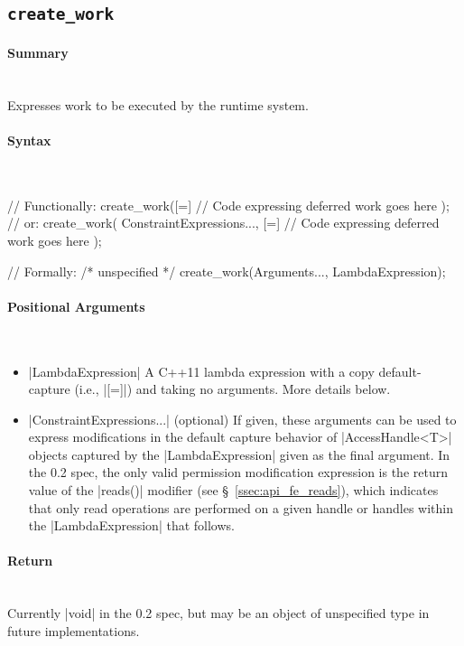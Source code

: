 \subsection{\texttt{create\_work}}
\label{ssec:api_fe_cw}

\paragraph{Summary}\mbox{}\\
Expresses work to be executed by the runtime system.

\paragraph{Syntax}\mbox{}\\
\begin{CppCode}
// Functionally:
create_work([=]{
  // Code expressing deferred work goes here
});
// or:
create_work(
  ConstraintExpressions..., 
  [=]{
    // Code expressing deferred work goes here
  }
);

// Formally:
/* unspecified */ create_work(Arguments..., LambdaExpression);
\end{CppCode}

\paragraph{Positional Arguments}\mbox{}\\
\begin{itemize}
  \item |LambdaExpression| A C++11 lambda expression with a copy
  default-capture (i.e., |[=]|) and taking no arguments.  More details
  below.
  \item |ConstraintExpressions...| (optional) If given, these
  arguments can be used to express modifications in the default capture behavior
  of |AccessHandle<T>| objects captured by the |LambdaExpression|
  given as the final argument.  In the 0.2 spec, the only valid permission
  modification expression is the return value of the |reads()| modifier
  (see \S~\ref{ssec:api_fe_reads}), which indicates that only read operations
  are performed on a given handle or handles within the
  |LambdaExpression| that follows.
\end{itemize}


\paragraph{Return}\mbox{}\\
Currently |void| in the 0.2 spec, but may be an object of unspecified
type in future implementations.

